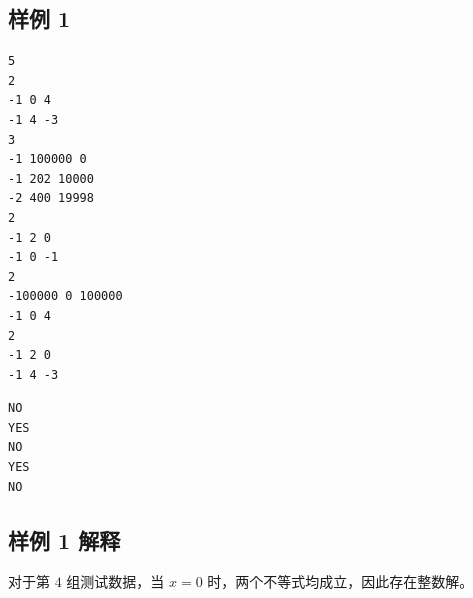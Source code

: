 \subsection{样例 1}

\begin{minipage}{\linewidth}
	\begin{minipage}[t]{0.49\linewidth}
		\begin{lstlisting}[title=\texttt{standard input}]
5
2
-1 0 4
-1 4 -3
3
-1 100000 0
-1 202 10000
-2 400 19998
2
-1 2 0
-1 0 -1
2
-100000 0 100000
-1 0 4
2
-1 2 0
-1 4 -3

\end{lstlisting}
	\end{minipage}
	\begin{minipage}[t]{0.49\linewidth}
		\begin{lstlisting}[title=\texttt{standard output}]
NO
YES
NO
YES
NO
\end{lstlisting}
	\end{minipage}
\end{minipage}


\subsection{样例 1 解释}

对于第 $4$ 组测试数据，当 $x=0$ 时，两个不等式均成立，因此存在整数解。
